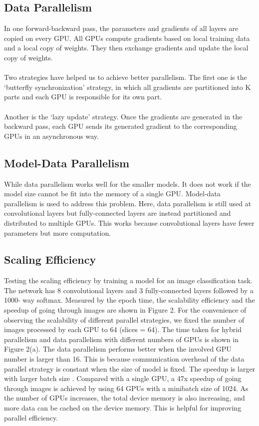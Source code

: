 \documentclass[12pt,letterpaper, onecolumn]{exam}
\begin{document}
    \subsection{Data Parallelism}
    In one forward-backward pass, the parameters and gradients of all layers are copied on every GPU. All GPUs compute gradients based on local training data and a local copy of weights. They then exchange gradients and update the local copy of weights.\\
    \\
    Two strategies have helped us to achieve better parallelism. The first one is the ‘butterfly synchronization’ strategy, in which all gradients are partitioned into K parts and each GPU is responsible for its own part.\\\\
    Another is the ‘lazy update’ strategy. Once the gradients are generated in the backward pass, each GPU sends its generated gradient to the corresponding GPUs in an asynchronous way. 
    
    \subsection{Model-Data Parallelism}
    While data parallelism works well for the smaller models. It does not work if the model size cannot be fit into the memory of a single GPU. Model-data parallelism is used to address this problem. Here, data parallelism is still used at convolutional layers but fully-connected layers are instead partitioned and distributed to multiple GPUs. This works  because convolutional layers have fewer parameters but more computation. 
    
    \subsection{Scaling Efficiency}
    Testing the scaling efficiency by training a model for an image classification task. The network has 8 convolutional layers and 3 fully-connected layers followed by a 1000- way softmax. Measured by the epoch time, the scalability efficiency and the speedup of going through images are shown in Figure 2. For the convenience of observing the scalability of different parallel strategies, we fixed the number of images processed by each GPU to 64 (slices = 64). The time taken for hybrid parallelism and data parallelism with different numbers of GPUs is shown in Figure 2(a). The data parallelism performs better when the involved GPU number is larger than 16. This is because communication overhead of the data parallel strategy is constant when the size of model is fixed. The speedup is larger with larger batch size . Compared with a single GPU, a 47x speedup of going through images is achieved by using 64 GPUs with a minibatch size of 1024. As the number of GPUs increases, the total device memory is also increasing, and more data can be cached on the device memory. This is helpful for improving parallel efficiency.
    
\end{document}
